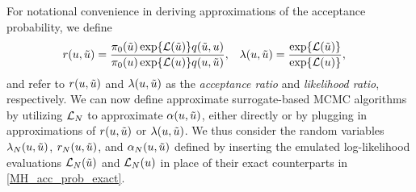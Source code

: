 \documentclass[12pt]{article}
\begin{document}
For notational convenience in deriving approximations 
of the acceptance probability, we define 
\begin{align}
&\accProbRatio(\Par, \propPar) 
= \frac{\priorDens(\propPar) \Exp{\llik(\propPar)} \propDens(\propPar, \Par)}{\priorDens(\Par) \Exp{\llik(\Par)} \propDens(\Par, \propPar)}, 
&&\likRatio(\Par, \propPar) = \frac{\Exp{\llik(\propPar)}}{\Exp{\llik(\Par)}},
\label{MH_acc_prob_exact}
\end{align}
and refer to $\accProbRatio(\Par, \propPar)$ and $\likRatio(\Par, \propPar)$ 
as the \textit{acceptance ratio} and \textit{likelihood ratio}, respectively. We can now define approximate 
surrogate-based MCMC algorithms by utilizing $\llikEm[\Ndesign]$ to approximate $\accProbMH(\Par, \propPar)$, 
either directly or by plugging in approximations of $\accProbRatio(\Par, \propPar)$ or $\likRatio(\Par, \propPar)$.  
We thus consider the random variables $\Em[\Ndesign]{\likRatio}(\Par, \propPar)$, $\Em[\Ndesign]{\accProbRatio}(\Par, \propPar)$, 
and $\Em[\Ndesign]{\accProbMH}(\Par, \propPar)$ defined by inserting the emulated log-likelihood evaluations
$\llikEm[\Ndesign](\propPar)$ and $\llikEm[\Ndesign](\Par)$ in place of their exact counterparts in \ref{MH_acc_prob_exact}. 

\end{document}
